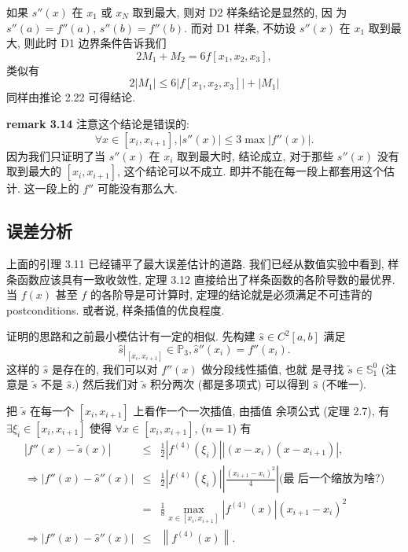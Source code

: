 \documentclass[a4paper]{ctexart}
\newcommand{\remark}[1]
{\noindent {\bf Remark {#1}}}
\begin{document}
如果 $s''(x)$ 在 $x_1$ 或 $x_N$ 取到最大, 则对 D2 样条结论是显然的, 因
为 $s''(a) = f''(a)$, $s''(b) = f''(b)$. 而对 D1 样条, 不妨设 $s''(x)$
在 $x_1$ 取到最大, 则此时 D1 边界条件告诉我们
$$
2M_1 + M_2 = 6 f[x_1, x_2, x_3],
$$
类似有
$$
2 |M_1| \leq 6|f[x_1, x_2, x_3]| + |M_1|
$$
同样由推论 2.22 可得结论.

{\bf remark 3.14} 注意这个结论是错误的:
$$
\forall x \in [x_i, x_{i + 1}], |s''(x)| \leq 3 \max |f''(x)|.
$$
因为我们只证明了当 $s''(x)$ 在 $x_i$ 取到最大时, 结论成立, 对于那些
$s''(x)$ 没有取到最大的 $[x_i, x_{i + 1}]$, 这个结论可以不成立.
即并不能在每一段上都套用这个估计. 这一段上的 $f''$ 可能没有那么大. 

\subsection{误差分析}

\remark{3.16} 

上面的引理 3.11 已经铺平了最大误差估计的道路. 我们已经从数值实验中看到,
样条函数应该具有一致收敛性, 定理 3.12 直接给出了样条函数的各阶导数的最优界. 
当 $f(x)$ 甚至 $f$ 的各阶导是可计算时, 定理的结论就是必须满足不可违背的 
postconditions. 或者说, 样条插值的优良程度. 

证明的思路和之前最小模估计有一定的相似. 先构建 $\hat{s} \in C^2[a, b]$ 满足
$$
\left.\hat{s}\right|_{[x_i, x_{i + 1}]} \in \mathbb{P}_3, \hat{s}''(x_i) = f''(x_i).
$$
这样的 $\hat{s}$ 是存在的, 我们可以对 $f''(x)$ 做分段线性插值, 也就
是寻找 $\tilde{s} \in \mathbb{S}_1^0$ (注意是 $\tilde{s}$ 不是 $\hat{s}$.)
然后我们对 $\tilde{s}$ 积分两次 (都是多项式) 可以得到 $\hat{s}$ (不唯一).

把 $\tilde{s}$ 在每一个 $[x_i, x_{i + 1}]$ 上看作一个一次插值, 由插值
余项公式 (定理 2.7), 有 $\exists \xi_i \in [x_i, x_{i + 1}]$ 使得
$\forall x \in [x_i, x_{i + 1}]$, ($n = 1$) 有
$$
\begin{array}{rcl}
  \left| f''(x) - \tilde{s}(x)\right| &\leq& \frac{1}{2}
  \left|f^{(4)}(\xi_i)\right||(x - x_i)(x - x_{i + 1})|,\\ \Rightarrow
  \left| f''(x) - \hat{s}''(x)\right| &\leq& \frac{1}{2}
  \left|f^{(4)}(\xi_i)\right||\frac{(x_{i + 1} - x_i)^2}{4}| \mbox{(最
    后一个缩放为啥?)}\\ & = & \frac{1}{8} \max_{x \in [x_i, x_{i +
        1}]} \left|f^{(4)}(x)\right|(x_{i + 1} - x_i)^2 \\ \Rightarrow
  \left| f''(x) - \hat{s}''(x)\right| &\leq&
  \left\|f^{(4)}(x)\right\|.
\end{array}
$$
\end{document}
